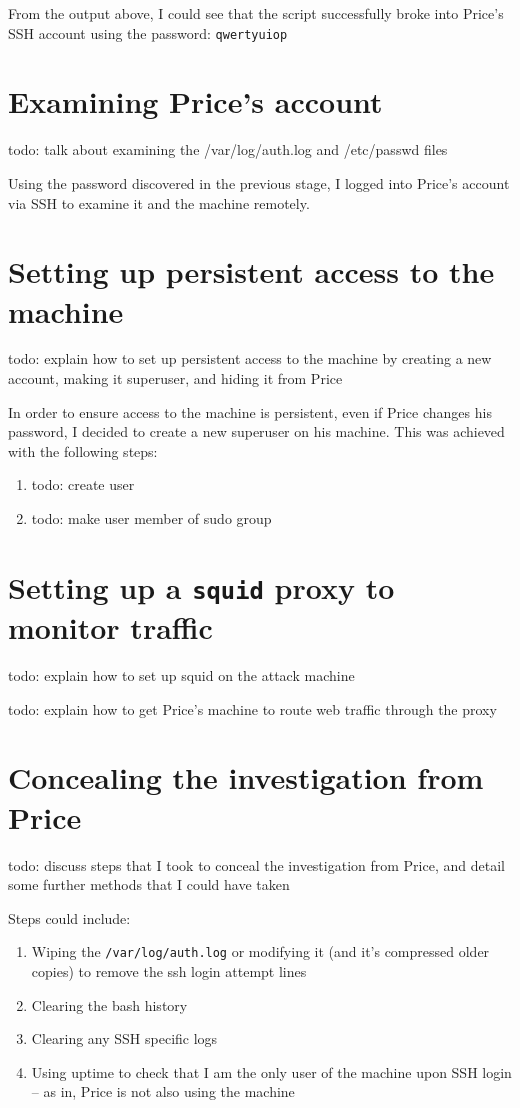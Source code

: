 \documentclass[12pt]{report}
\begin{document}
From the output above, I could see that the script successfully broke into Price's SSH account using the password: \texttt{qwertyuiop}


\section{Examining Price's account}
todo: talk about examining the /var/log/auth.log and /etc/passwd files

Using the password discovered in the previous stage, I logged into Price's account via SSH to examine it and the machine remotely.

\section{Setting up persistent access to the machine}
todo: explain how to set up persistent access to the machine by creating a new account, making it superuser, and hiding it from Price

In order to ensure access to the machine is persistent, even if Price changes his password, I decided to create a new superuser on his machine. This was achieved with the following steps:
\begin{enumerate}
  \item todo: create user
  \item todo: make user member of sudo group
\end{enumerate}

\section{Setting up a \texttt{squid} proxy to monitor traffic}
todo: explain how to set up squid on the attack machine

todo: explain how to get Price's machine to route web traffic through the proxy

\section{Concealing the investigation from Price}
todo: discuss steps that I took to conceal the investigation from Price, and detail some further methods that I could have taken

Steps could include:
\begin{enumerate}
  \item Wiping the \texttt{/var/log/auth.log} or modifying it (and it's compressed older copies) to remove the ssh login attempt lines
  \item Clearing the bash history
  \item Clearing any SSH specific logs
  \item Using uptime to check that I am the only user of the machine upon SSH login -- as in, Price is not also using the machine
\end{enumerate}
\end{document}
